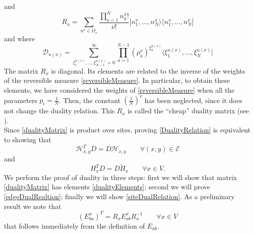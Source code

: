 \documentclass[10pt]{article}
\numberwithin{equation}{section}
\numberwithin{equation}{subsection}
\newcommand{\dd}{\mathcal{D}_{u(x)}}
\begin{document}
and
\begin{equation}\label{Revmatrix}
    R_{x}=\sum_{n^{x}\in\Omega_{x}}\frac{\prod_{a=1}^{N}n_{a}^{x}!}{\nu!}|n_{1}^{x},\ldots,n_{N}^{x}\rangle\langle n_{1}^{x},\ldots,n_{N}^{x}|
\end{equation}
and where 
\begin{equation}\label{dualityMatrix2}
\dd=\sum_{\xi_{1}^{u(x)},\ldots,\xi_{N-1}^{u(x)}=0}^{\infty}\prod_{a=1}^{N-1}\left(\rho_{a}^{x}\right)^{\xi_{a}^{u(x)}}\langle \xi_{1}^{u(x)},\ldots,\xi_{N}^{u(x)}|
\end{equation}
The matrix $R_{x}$ is diagonal. Its elements are related to the inverse of the weights of the reversible measure \eqref{reversibleMeasure}. In particular, to obtain these elements, we have considered the weights of \eqref{reversibleMeasure} when all the parameters $p_{i}=\frac{1}{N}$. Then, the constant $\left(\frac{1}{N}\right)^{\nu}$ has been neglected, since it does not change the duality relation. This $R_{x}$ is called the ``cheap'' duality matrix (see \cite{giardina2009duality}). \\
Since \eqref{dualityMatrix} is product over sites, proving \eqref{DualityRelation} is equivalent to showing that 
\begin{equation}\label{edgeDualRealtion}
    \mathcal{H}_{x,y}^{T}D=D\mathcal{H}_{x,y}\qquad \forall (x,y)\in \mathcal{E}
\end{equation}
and 
\begin{equation}\label{siteDualRelation}
    H_{x}^{T}D=D\widetilde{H}_{x}\qquad \forall x\in V.
\end{equation}
We perform the proof of duality in three steps: first we will show that matrix \eqref{dualityMatrix} has elements \eqref{dualityElements}; second we will prove \eqref{edgeDualRealtion}; finally we will show \eqref{siteDualRelation}. 
As a preliminary result we note that 
\begin{equation}\label{transpositionPropertyR}
(E_{ba}^{x})^{T}=R_{x}E_{ab}^{x}R_{x}^{-1}\qquad \forall x\in V
\end{equation}
that follows immediately from the definition of $E_{ab}$. 

\end{document}

